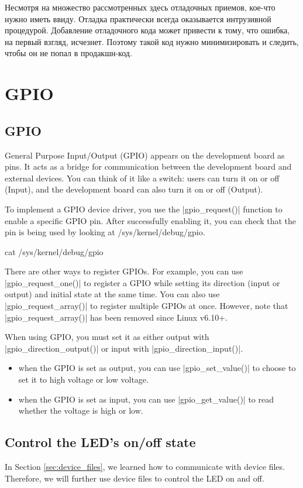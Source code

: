 \documentclass[10pt, oneside]{book}
\begin{document}
Несмотря на множество рассмотренных здесь отладочных приемов, кое-что нужно иметь ввиду. Отладка практически всегда оказывается интрузивной процедурой. Добавление отладочного кода может привести к тому, что ошибка, на первый взгляд, исчезнет. Поэтому такой код нужно минимизировать и следить, чтобы он не попал в продакшн-код.

\section{GPIO}
\label{sec:gpio}
\subsection{GPIO}
\label{sec:gpio_introduction}
General Purpose Input/Output (GPIO) appears on the development board as pins.
It acts as a bridge for communication between the development board and external devices.
You can think of it like a switch: users can turn it on or off (Input), and the development board can also turn it on or off (Output).

To implement a GPIO device driver, you use the \cpp|gpio_request()| function to enable a specific GPIO pin.
After successfully enabling it, you can check that the pin is being used by looking at /sys/kernel/debug/gpio.

\begin{codebash}
cat /sys/kernel/debug/gpio
\end{codebash}

There are other ways to register GPIOs.
For example, you can use \cpp|gpio_request_one()| to register a GPIO while setting its direction (input or output) and initial state at the same time.
You can also use \cpp|gpio_request_array()| to register multiple GPIOs at once. However, note that \cpp|gpio_request_array()| has been removed since Linux v6.10+.

When using GPIO, you must set it as either output with \cpp|gpio_direction_output()| or input with \cpp|gpio_direction_input()|.

\begin{itemize}
  \item when the GPIO is set as output, you can use \cpp|gpio_set_value()| to choose to set it to high voltage or low voltage.
  \item when the GPIO is set as input, you can use \cpp|gpio_get_value()| to read whether the voltage is high or low.
\end{itemize}

\subsection{Control the LED's on/off state}
\label{sec:gpio_led}
In Section \ref{sec:device_files}, we learned how to communicate with device files.
Therefore, we will further use device files to control the LED on and off.
\end{document}
